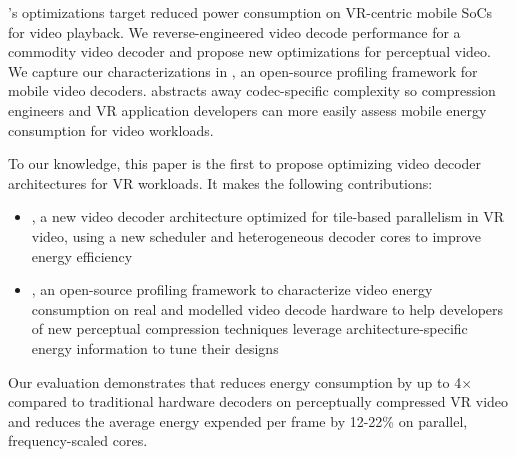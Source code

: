 \nameArch's optimizations target reduced power consumption on  VR-centric mobile SoCs  for video playback.
We reverse-engineered video decode performance for a commodity video decoder and propose new optimizations for perceptual video.
We capture our characterizations in \nameArchprof, an open-source profiling framework for mobile video decoders.
\nameArchprof abstracts away codec-specific complexity so compression engineers and VR application developers can more easily assess mobile energy consumption for video workloads.

To our knowledge, this paper is the first to propose optimizing video decoder architectures for VR workloads.
It makes the following contributions:
\begin{itemize}
    \item \nameArch, a new video decoder architecture optimized for tile-based parallelism in VR video, using a new scheduler and heterogeneous decoder cores to improve energy efficiency
    \item \nameArchprof, an open-source profiling framework to characterize video energy consumption on real and modelled video decode hardware to help developers of new perceptual compression techniques leverage architecture-specific energy information to tune their designs
\end{itemize}

Our evaluation demonstrates that \nameArch reduces energy consumption by up to 4$\times$ compared to traditional hardware decoders on perceptually compressed VR video and reduces the average energy expended per frame by 12-22\% on parallel, frequency-scaled cores.
